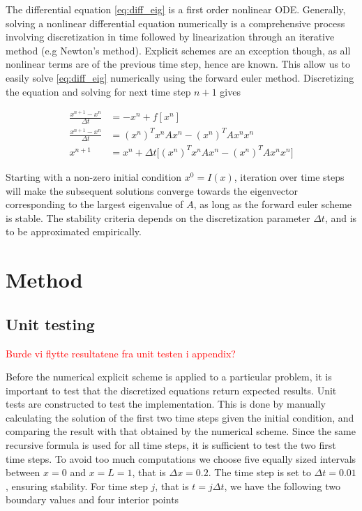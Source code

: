 \documentclass[12pt]{extarticle}
\begin{document}
The differential equation \eqref{eq:diff_eig} is a first order nonlinear ODE. Generally, solving a nonlinear differential equation numerically is a comprehensive process involving discretization in time followed by linearization through an iterative method (e.g Newton's method). Explicit schemes are an exception though, as all nonlinear terms are of the previous time step, hence are known. This allow us to easily solve \eqref{eq:diff_eig} numerically using the forward euler method. Discretizing the equation and solving for next time step $n+1$ gives

\begin{align*}
	\frac{x^{n+1}-x^n}{\Delta t} &= -x^n + f[x^n] \\
	\frac{x^{n+1}-x^n}{\Delta t} &= (x^n)^T x^n A x^n - (x^n)^T A x^n x^n \\
	x^{n+1} &= x^n + \Delta t\big[ (x^n)^T x^n A x^n - (x^n)^T A x^n x^n \big]
\end{align*}

Starting with a non-zero initial condition $x^0 = I(x)$, iteration over time steps will make the subsequent solutions converge towards the eigenvector corresponding to the largest eigenvalue of $A$, as long as the forward euler scheme is stable. The stability criteria depends on the discretization parameter $\Delta t$, and is to be approximated empirically. 



\section{Method}
\subsection{Unit testing}
\textcolor{red}{Burde vi flytte resultatene fra unit testen i appendix?}

Before the numerical explicit scheme is applied to a particular problem, it is important to test that the discretized equations return expected results. Unit tests are constructed to test the implementation. This is done by manually calculating the solution of the first two time steps given the initial condition, and comparing the result with that obtained by the numerical scheme. Since the same recursive formula is used for all time steps, it is sufficient to test the two first time steps. To avoid too much computations we choose five equally sized intervals between $x=0$ and $x=L=1$, that is $\Delta x = 0.2$. The time step is set to $\Delta t = 0.01$, ensuring stability.
For time step $j$, that is $t=j\Delta t$, we have the following two boundary values and four interior points
\end{document}

